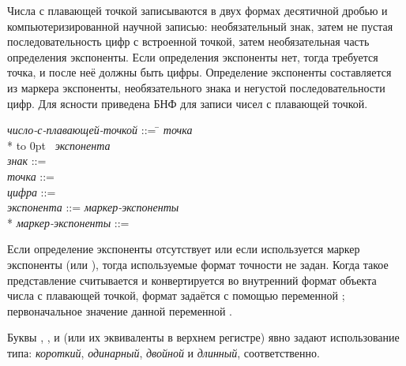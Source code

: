 Числа с плавающей точкой записываются в двух формах десятичной дробью и
компьютеризированной научной записью: необязательный знак, затем не пустая
последовательность цифр с встроенной точкой, затем необязательная
часть определения экспоненты.
Если определения экспоненты нет, тогда требуется точка, и после неё должны быть
цифры.
Определение экспоненты составляется из маркера экспоненты, необязательного знака
и негустой последовательности цифр.
Для ясности приведена БНФ для записи чисел с плавающей точкой.

\begin{tabbing}
\emph{число-с-плавающей-точкой} ::= \=  {\it
точка}   \\*
\>\hbox to 0pt{\hss\Mor~}   {\it
экспонента} \\
\emph{знак} ::= \cdf{+} {\Mor} \cdf{-} \\
\emph{точка} ::=  \\
\emph{цифра} ::=  {\Mor}  {\Mor}  {\Mor}  {\Mor} 
         {\Mor}  {\Mor}  {\Mor}  {\Mor}  {\Mor} \\
\emph{экспонента} ::= \emph{маркер-экспоненты}  \\*
\emph{маркер-экспоненты} ::=  {\Mor}  {\Mor} 
{\Mor}  {\Mor}  {\Mor}  {\Mor}  {\Mor}  {\Mor}
 {\Mor} 
\end{tabbing}

Если определение экспоненты отсутствует или если используется маркер
экспоненты  (или ), тогда используемые формат точности не
задан. Когда такое представление считывается и конвертируется во внутренний
формат объекта числа с плавающей точкой, формат задаётся с помощью
переменной ; первоначальное значение данной
переменной .

Буквы  , ,  и  (или их эквиваленты в верхнем регистре)
явно задают использование типа: \emph{короткий}, \emph{одинарный}, \emph{двойной} и
\emph{длинный}, соответственно.

